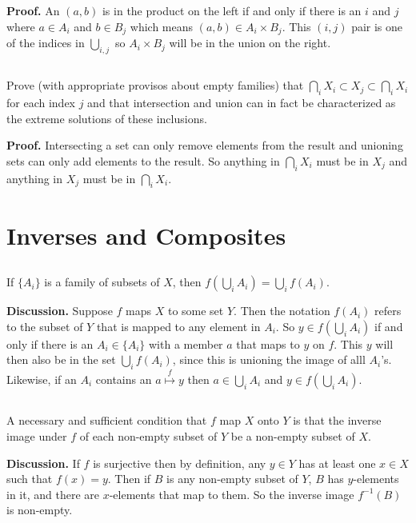 \documentclass{article}
\begin{document}
\textbf{Proof.} An $(a, b)$ is in the product on the left if and only if there is an $i$ and $j$ where $a \in A_i$ and $b \in B_j$ which means $(a, b) \in A_i \times B_j$. This $(i, j)$ pair is one of the indices in $\bigcup_{i,j}$ so $A_i \times B_j$ will be in the union on the right.

\subsection{} Prove (with appropriate provisos about empty families) that $\bigcap_i X_i \subset X_j \subset \bigcap_i X_i$ for each index $j$ and that intersection and union can in fact be characterized as the extreme solutions of these inclusions.

\textbf{Proof.} Intersecting a set can only remove elements from the result and unioning sets can only add elements to the result. So anything in $\bigcap_i X_i $ must be in $X_j$ and anything in $X_j$ must be in $\bigcap_i X_i$.

\section{Inverses and Composites}

\subsection{} If $\{A_i\}$ is a family of subsets of $X$, then $f\left(\bigcup_i A_i\right) = \bigcup_i f(A_i)$.

\textbf{Discussion.} Suppose $f$ maps $X$ to some set $Y$. Then the notation $f(A_i)$ refers to the subset of $Y$ that is mapped to any element in $A_i$. So $y \in f\left(\bigcup_i A_i\right)$ if and only if there is an $A_i \in \{A_i\}$ with a member $a$ that maps to $y$ on $f$. This $y$ will then also be in the set $\bigcup_i f(A_i)$, since this is unioning the image of alll $A_i$'s. Likewise, if an $A_i$ contains an $a \stackrel{f}{\longmapsto} y$ then $a \in \bigcup_i A_i$ and $y \in f\left(\bigcup_i A_i \right)$. 

\subsection{} A necessary and sufficient condition that $f$ map $X$ onto $Y$ is that the inverse image under $f$ of each non-empty subset of $Y$ be a non-empty subset of $X$.

\textbf{Discussion.} If $f$ is surjective then by definition, any $y \in Y$ has at least one $x \in X$ such that $f(x) = y$. Then if $B$ is any non-empty subset of $Y$, $B$ has $y$-elements in it, and there are $x$-elements that map to them. So the inverse image $f^{-1}(B)$ is non-empty.
\end{document}
